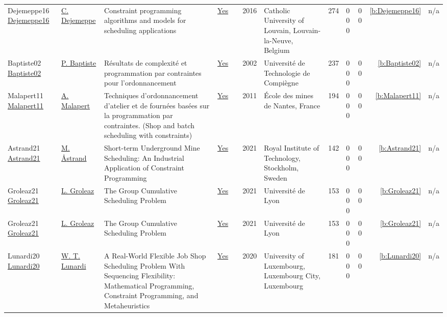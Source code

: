 {\begin{longtable}{>{\raggedright\arraybackslash}p{3cm}>{\raggedright\arraybackslash}p{4.5cm}>{\raggedright\arraybackslash}p{6.0cm}rrrp{2.5cm}rp{1cm}p{1cm}rr}
Dejemeppe16 \href{https://hdl.handle.net/2078.1/178078}{Dejemeppe16} & \hyperref[auth:a202]{C. Dejemeppe} & Constraint programming algorithms and models for scheduling applications & \href{../works/Dejemeppe16.pdf}{Yes} & \cite{Dejemeppe16} & 2016 & Catholic University of Louvain, Louvain-la-Neuve, Belgium & 274 & 0 0 0 & 0 0 & \ref{b:Dejemeppe16} & n/a\\
Baptiste02 \href{https://theses.hal.science/tel-00124998}{Baptiste02} & \hyperref[auth:a162]{P. Baptiste} & {R{\'e}sultats de complexit{\'e} et programmation par contraintes pour l'ordonnancement} & \href{../works/Baptiste02.pdf}{Yes} & \cite{Baptiste02} & 2002 & {Universit{\'e} de Technologie de Compi{\`e}gne} & 237 & 0 0 0 & 0 0 & \ref{b:Baptiste02} & n/a\\
Malapert11 \href{https://tel.archives-ouvertes.fr/tel-00630122}{Malapert11} & \hyperref[auth:a82]{A. Malapert} & Techniques d'ordonnancement d'atelier et de fourn{\'{e}}es bas{\'{e}}es sur la programmation par contraintes. (Shop and batch scheduling with constraints) & \href{../works/Malapert11.pdf}{Yes} & \cite{Malapert11} & 2011 & {\'{E}}cole des mines de Nantes, France & 194 & 0 0 0 & 0 0 & \ref{b:Malapert11} & n/a\\
Astrand21 \href{https://nbn-resolving.org/urn:nbn:se:kth:diva-294959}{Astrand21} & \hyperref[auth:a74]{M. {\AA}strand} & Short-term Underground Mine Scheduling: An Industrial Application of Constraint Programming & \href{../works/Astrand21.pdf}{Yes} & \cite{Astrand21} & 2021 & Royal Institute of Technology, Stockholm, Sweden & 142 & 0 0 0 & 0 0 & \ref{b:Astrand21} & n/a\\
Groleaz21 \href{https://hal.science/tel-03266690}{Groleaz21} & \hyperref[auth:a83]{L. Groleaz} & {The Group Cumulative Scheduling Problem} & \href{../works/Groleaz21.pdf}{Yes} & \cite{Groleaz21} & 2021 & {Universit{\'e} de Lyon} & 153 & 0 0 0 & 0 0 & \ref{b:Groleaz21} & n/a\\
Groleaz21 \href{https://hal.science/tel-03266690}{Groleaz21} & \hyperref[auth:a83]{L. Groleaz} & {The Group Cumulative Scheduling Problem} & \href{../works/Groleaz21.pdf}{Yes} & \cite{Groleaz21} & 2021 & {Universit{\'e} de Lyon} & 153 & 0 0 0 & 0 0 & \ref{b:Groleaz21} & n/a\\
Lunardi20 \href{http://orbilu.uni.lu/handle/10993/43893}{Lunardi20} & \hyperref[auth:a496]{W. T. Lunardi} & A Real-World Flexible Job Shop Scheduling Problem With Sequencing Flexibility: Mathematical Programming, Constraint Programming, and Metaheuristics & \href{../works/Lunardi20.pdf}{Yes} & \cite{Lunardi20} & 2020 & University of Luxembourg, Luxembourg City, Luxembourg & 181 & 0 0 0 & 0 0 & \ref{b:Lunardi20} & n/a\\

\end{longtable}}
